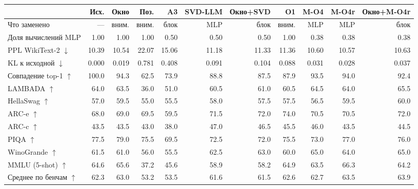 \begin{tabular}{lrrrrrrrrrr}
\toprule
 & Исх. & Окно & Поз. & A3 & SVD-LLM & Окно+SVD & O1 & M-O4 & M-O4r & Окно+M-O4r \\
\midrule
Что заменено & — & вним. & вним. & блок & MLP & блок & вним. & MLP & MLP & блок \\
Доля вычислений MLP & 1.00 & 1.00 & 1.00 & 0.50 & 0.50 & 0.50 & 1.00 & 0.38 & 0.38 & 0.38 \\
PPL WikiText-2 $\downarrow$ & 10.39 & 10.54 & 22.07 & 15.06 & 11.18 & 11.33 & 11.36 & 10.60 & 10.57 & 10.63 \\
KL к исходной $\downarrow$ & 0.000 & 0.019 & 0.781 & 0.408 & 0.091 & 0.104 & 0.088 & 0.031 & 0.028 & 0.037 \\
Совпадение top-1 $\uparrow$ & 100.0 & 94.3 & 62.5 & 73.9 & 88.8 & 87.5 & 87.9 & 93.5 & 94.0 & 92.4 \\
LAMBADA $\uparrow$ & 64.0 & 63.5 & 36.0 & 51.0 & 60.5 & 61.0 & 60.5 & 64.5 & 64.0 & 65.5 \\
HellaSwag $\uparrow$ & 57.0 & 59.5 & 55.0 & 55.5 & 58.0 & 57.5 & 57.5 & 56.5 & 59.5 & 60.0 \\
ARC-e $\uparrow$ & 68.0 & 69.0 & 69.5 & 59.5 & 71.5 & 72.0 & 74.0 & 70.5 & 70.5 & 72.0 \\
ARC-c $\uparrow$ & 43.5 & 43.5 & 43.0 & 38.0 & 47.0 & 46.5 & 45.5 & 46.0 & 43.5 & 44.5 \\
PIQA $\uparrow$ & 77.5 & 79.0 & 75.5 & 69.5 & 72.5 & 72.0 & 75.5 & 73.0 & 77.0 & 76.0 \\
WinoGrande $\uparrow$ & 61.5 & 61.0 & 56.0 & 55.5 & 62.5 & 63.0 & 60.0 & 65.0 & 64.0 & 65.0 \\
MMLU (5-shot) $\uparrow$ & 64.6 & 65.6 & 37.2 & 45.6 & 58.9 & 58.2 & 64.9 & 63.5 & 66.3 & 64.2 \\
Среднее по бенчам $\uparrow$ & 62.3 & 63.0 & 53.2 & 53.5 & 61.6 & 61.5 & 62.6 & 62.7 & 63.5 & 63.9 \\
\bottomrule
\end{tabular}
